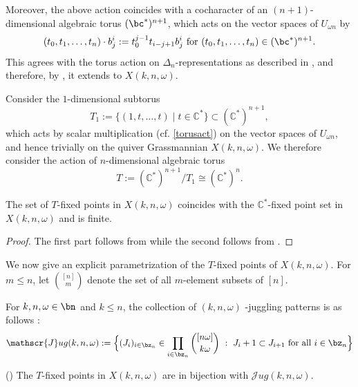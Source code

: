 \documentclass[10pt, a4paper, reqno]{amsart}
\begin{document}
Moreover, the above action coincides with  a cocharacter of an $(n+1)$-dimensional algebraic torus $(\bc^*)^{n+1}$, which acts on the vector spaces of $U_{\omega n}$ by 
\begin{equation}\label{torusact}
	(t_0,t_1,\ldots,t_n)\cdot b^i_j:=t_0^{j-1}t_{i-j+1}b^i_j \text{ for } (t_0,t_1,\ldots,t_n)\in (\bc^*)^{n+1}.
\end{equation}
This agrees with the torus action on $\Delta_n$-representations as described in \cite{lp23}, and therefore, by \cite[Lemma 5.12]{lp23}, it extends to $X(k,n,\omega)$.

Consider the $1$-dimensional subtorus
\[
T_1 := \{(1,t,\ldots,t) \mid t \in \mathbb{C}^*\} \subset (\mathbb{C}^*)^{n+1},
\]
which acts  by scalar multiplication (cf.  \eqref{torusact}) on the vector spaces of $U_{\omega n}$, and hence trivially on the quiver Grassmannian $X(k,n,\omega)$. 
We therefore consider the action of $n$-dimensional algebraic torus 
\[
T := (\mathbb{C}^*)^{n+1}/T_1 \cong (\mathbb{C}^*)^n.
\]
\begin{lema}
	The set of $T$-fixed points in $X(k,n,\omega)$ coincides with the $\mathbb{C}^*$-fixed point set in $X(k,n,\omega)$ and is finite.
\end{lema}

\begin{proof}
	The first part follows from \cite[Theorem 5.14]{lp23} while the second follows from \cite[Theorem 1]{cer11}.
\end{proof}

We now give an explicit parametrization of the $T$-fixed points of $X(k,n,\omega)$. For $m\leq n$, let $\binom{[n]}{m}$ denote the set of all $m$-element subsets of $[n]$.
\begin{defe}
	For $k,n,\omega\in\bn$ and $k\leq n$, the collection of $(k,n,\omega)$ -juggling patterns is as follows :
	\[\mathscr{J}ug(k,n,\omega):=\Big\{(J_i)_{i\in\bz_n}\in\prod_{i\in\bz_n}\binom{[n\omega]}{k\omega} ~:~J_i+1\subset J_{i+1} \text{ for all } i\in\bz_n\Big\}\]
\end{defe}

\begin{propo}\label{bij:fixedpttojug}(\cite[Lemma 2.8]{flp24})
	The $T$-fixed points in $X(k,n,\omega)$ are in bijection with $\mathscr{J}ug(k,n,\omega)$.
\end{propo}
\end{document}
